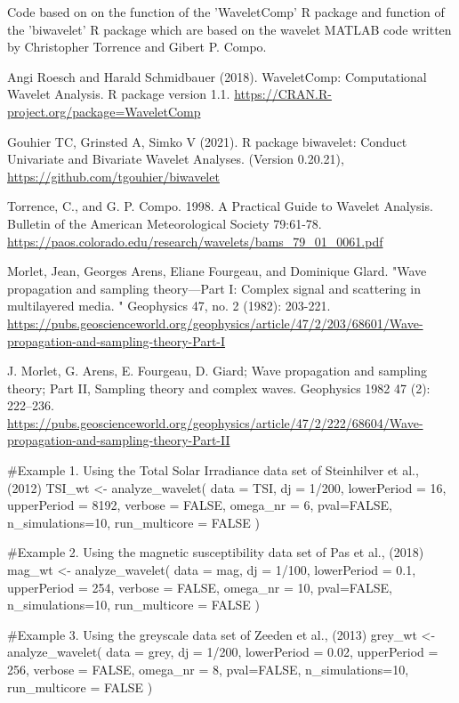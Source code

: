 \documentclass[a4paper]{book}
\begin{document}
%
\begin{Author}
Code based on on the  function of the 'WaveletComp' R package
and  function of the 'biwavelet' R package which are based on the
wavelet MATLAB code written by Christopher Torrence and Gibert P. Compo.
\end{Author}
%
\begin{References}
Angi Roesch and Harald Schmidbauer (2018). WaveletComp: Computational
Wavelet Analysis. R package version 1.1.
\url{https://CRAN.R-project.org/package=WaveletComp}

Gouhier TC, Grinsted A, Simko V (2021). R package biwavelet: Conduct Univariate and Bivariate Wavelet Analyses. (Version 0.20.21),
\url{https://github.com/tgouhier/biwavelet}

Torrence, C., and G. P. Compo. 1998. A Practical Guide to Wavelet Analysis.
Bulletin of the American Meteorological Society 79:61-78.
\url{https://paos.colorado.edu/research/wavelets/bams_79_01_0061.pdf}

Morlet, Jean, Georges Arens, Eliane Fourgeau, and Dominique Glard.
"Wave propagation and sampling theory—Part I: Complex signal and scattering in multilayered media.
" Geophysics 47, no. 2 (1982): 203-221.
\url{https://pubs.geoscienceworld.org/geophysics/article/47/2/203/68601/Wave-propagation-and-sampling-theory-Part-I}

J. Morlet, G. Arens, E. Fourgeau, D. Giard;
Wave propagation and sampling theory; Part II, Sampling theory and complex waves.
Geophysics 1982 47 (2): 222–236. \url{https://pubs.geoscienceworld.org/geophysics/article/47/2/222/68604/Wave-propagation-and-sampling-theory-Part-II}
\end{References}
%
\begin{Examples}
\begin{ExampleCode}

#Example 1. Using the Total Solar Irradiance data set of Steinhilver et al., (2012)
TSI_wt <-
 analyze_wavelet(
   data = TSI,
   dj = 1/200,
   lowerPeriod = 16,
   upperPeriod = 8192,
   verbose = FALSE,
   omega_nr = 6,
   pval=FALSE,
   n_simulations=10,
   run_multicore = FALSE
 )


#Example 2. Using the magnetic susceptibility data set of Pas et al., (2018)
mag_wt <-
analyze_wavelet(
data = mag,
dj = 1/100,
lowerPeriod = 0.1,
upperPeriod = 254,
verbose = FALSE,
omega_nr = 10,
pval=FALSE,
n_simulations=10,
run_multicore = FALSE
)

#Example 3. Using the greyscale data set of Zeeden et al., (2013)
grey_wt <-
 analyze_wavelet(
   data = grey,
   dj = 1/200,
   lowerPeriod = 0.02,
   upperPeriod = 256,
   verbose = FALSE,
   omega_nr = 8,
   pval=FALSE,
   n_simulations=10,
   run_multicore = FALSE
 )


\end{ExampleCode}
\end{Examples}
\end{document}
